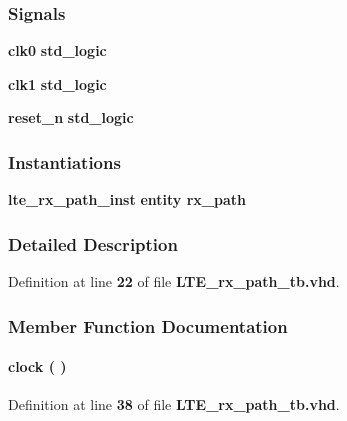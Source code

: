 \subsubsection*{Signals}
 \begin{DoxyCompactItemize}
\item 
{\bf clk0} {\bfseries \textcolor{comment}{std\+\_\+logic}\textcolor{vhdlchar}{ }} 
\item 
{\bf clk1} {\bfseries \textcolor{comment}{std\+\_\+logic}\textcolor{vhdlchar}{ }} 
\item 
{\bf reset\+\_\+n} {\bfseries \textcolor{comment}{std\+\_\+logic}\textcolor{vhdlchar}{ }} 
\end{DoxyCompactItemize}
\subsubsection*{Instantiations}
 \begin{DoxyCompactItemize}
\item 
{\bf lte\+\_\+rx\+\_\+path\+\_\+inst}  {\bfseries entity rx\+\_\+path}   
\end{DoxyCompactItemize}


\subsubsection{Detailed Description}


Definition at line {\bf 22} of file {\bf L\+T\+E\+\_\+rx\+\_\+path\+\_\+tb.\+vhd}.



\subsubsection{Member Function Documentation}
\paragraph[{clock}]{\setlength{\rightskip}{0pt plus 5cm} {\bfseries \textcolor{vhdlchar}{ }} clock ( ) \hspace{0.3cm}{\ttfamily [Process]}}\label{classLTE__rx__path__tb_1_1tb__behave_af761a67e9d7ce9e23381088b6f2ae893}


Definition at line {\bf 38} of file {\bf L\+T\+E\+\_\+rx\+\_\+path\+\_\+tb.\+vhd}.

